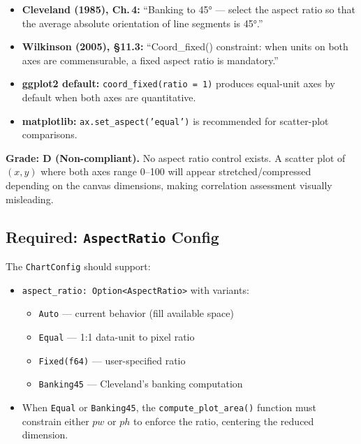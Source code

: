 \documentclass[11pt,a4paper]{article}
\begin{document}
\begin{itemize}[nosep]
  \item \textbf{Cleveland (1985), Ch.\,4:} ``Banking to 45° — select the
        aspect ratio so that the average absolute orientation of line segments
        is 45°.''
  \item \textbf{Wilkinson (2005), §11.3:} ``Coord\_fixed() constraint: when
        units on both axes are commensurable, a fixed aspect ratio is mandatory.''
  \item \textbf{ggplot2 default:} \texttt{coord\_fixed(ratio = 1)} produces
        equal-unit axes by default when both axes are quantitative.
  \item \textbf{matplotlib:} \texttt{ax.set\_aspect('equal')} is recommended
        for scatter-plot comparisons.
\end{itemize}

\begin{criticalbox}
\textbf{Grade: D (Non-compliant).} No aspect ratio control exists.
A scatter plot of $(x, y)$ where both axes range 0--100 will appear
stretched/compressed depending on the canvas dimensions, making
correlation assessment visually misleading.
\end{criticalbox}

\subsection{Required: \texttt{AspectRatio} Config}

The \texttt{ChartConfig} should support:
\begin{itemize}[nosep]
  \item \texttt{aspect\_ratio: Option<AspectRatio>} with variants:
    \begin{itemize}[nosep]
      \item \texttt{Auto} — current behavior (fill available space)
      \item \texttt{Equal} — 1:1 data-unit to pixel ratio
      \item \texttt{Fixed(f64)} — user-specified ratio
      \item \texttt{Banking45} — Cleveland's banking computation
    \end{itemize}
  \item When \texttt{Equal} or \texttt{Banking45}, the \texttt{compute\_plot\_area()}
        function must constrain either $pw$ or $ph$ to enforce the ratio,
        centering the reduced dimension.
\end{itemize}
\end{document}
